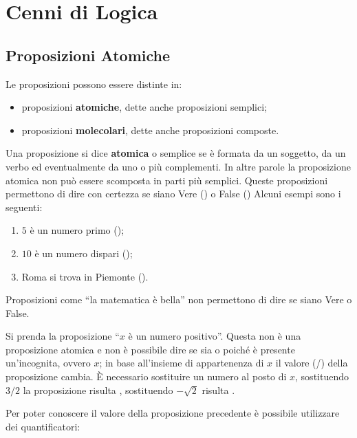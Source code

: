 
\chapter{Cenni di Logica}\label{chapt:cenni_di_logica}

\section{Proposizioni Atomiche}\label{sec:proposizioni_atomiche}
Le proposizioni possono essere distinte in:

\begin{itemize}
    \item proposizioni \textbf{atomiche}, dette anche proposizioni semplici;
    \item proposizioni \textbf{molecolari}, dette anche proposizioni composte.
\end{itemize}

Una proposizione si dice \textbf{atomica} o semplice se è formata da un
soggetto, da un verbo ed eventualmente da uno o più complementi. In altre
parole la proposizione atomica non può essere scomposta in parti più semplici.
Queste proposizioni permettono di dire con certezza se siano Vere (\true[l]) o
False (\false[l])
Alcuni esempi sono i seguenti:

\begin{enumerate}[label=\(\alph*\))]
    \item \(5\) è un numero primo (\true[l]);
    \item \(10\) è un numero dispari (\false[l]);
    \item Roma si trova in Piemonte (\false[l]).
\end{enumerate}

Proposizioni come ``la matematica è bella'' non permettono di dire se siano
Vere o False.

Si prenda la proposizione ``\(x\) è un numero positivo''. Questa non è una
proposizione atomica e non è possibile dire se sia \true[l]{} o \false[l]{}
poiché è presente un'incognita, ovvero \(x\); in base all'insieme di
appartenenza di \(x\) il valore (\true[l]/\false[l]) della proposizione
cambia. È necessario sostituire un numero al posto di \(x\), sostituendo
\(3/2\) la proposizione risulta \true[l]{}, sostituendo \(-\sqrt{2}\) risulta
\false[l]{}.

Per poter conoscere il valore della proposizione precedente è possibile
utilizzare dei quantificatori:

